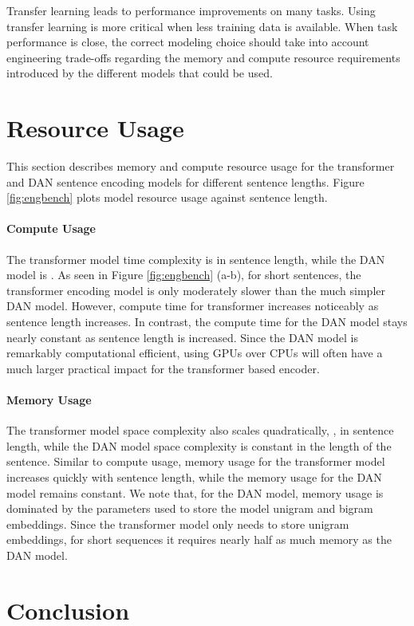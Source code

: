 \documentclass[11pt,a4paper]{article}
\begin{document}
Transfer learning leads to performance improvements on many tasks. Using transfer learning is more critical when less training data is available. When task performance is close, the correct modeling choice should take into account engineering trade-offs regarding the memory and compute resource requirements introduced by the different models that could be used.  

\section{Resource Usage}

This section describes memory and compute resource usage for the transformer and DAN sentence encoding models for different sentence lengths. Figure \ref{fig:engbench} plots model resource usage against sentence length. 

\paragraph{Compute Usage} The transformer model time complexity is  in sentence length, while the DAN model is . As seen in Figure \ref{fig:engbench} (a-b), for short sentences, the transformer encoding model is only moderately slower than the much simpler DAN model. However, compute time for transformer increases noticeably as sentence length increases. In contrast, the compute time for the DAN model stays nearly constant as sentence length is increased. Since the DAN model is remarkably computational efficient, using GPUs over CPUs will often have a much larger practical impact for the transformer based encoder. 

\paragraph{Memory Usage}

The transformer model space complexity also scales quadratically, , in sentence length, while the DAN model space complexity is constant in the length of the sentence. Similar to compute usage, memory usage for the transformer model increases quickly with sentence length, while the memory usage for the DAN model remains constant. We note that, for the DAN model, memory usage is dominated by the parameters used to store the model unigram and bigram embeddings. Since the transformer model only needs to store unigram embeddings, for short sequences it requires nearly half as much memory as the DAN model.

\section{Conclusion}
\end{document}
